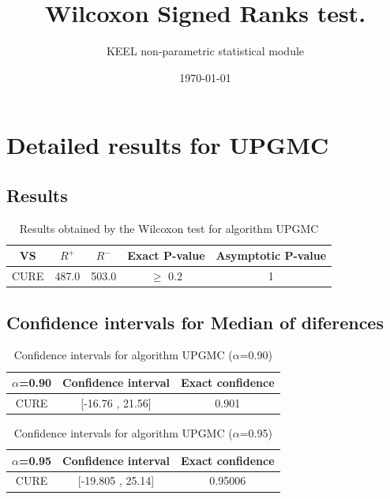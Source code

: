 \documentclass[a4paper,10pt]{article}
\title{Wilcoxon Signed Ranks test.}
\date{\today}
\author{KEEL non-parametric statistical module}
\begin{document}
\pagestyle{empty}
\maketitle
\thispagestyle{empty}



\section{Detailed results for UPGMC}


\subsection{Results}

\begin{table}[!htp]
\centering\small
\begin{tabular}{
|c|c|c|c|c|}
\hline
 VS & $R^{+}$ & $R^{-}$ & Exact P-value & Asymptotic P-value \\ \hline 
CURE & 487.0 & 503.0 & $\geq$ 0.2 & 1\\ \hline 

\end{tabular}
\caption{Results obtained by the Wilcoxon test for algorithm UPGMC}
\end{table}

\subsection{Confidence intervals for Median of diferences}

\begin{table}[!htp]
\centering\small
\begin{tabular}{
|c|c|c|}
\hline
 $\alpha$=0.90 & Confidence interval & Exact confidence \\ \hline 
CURE & [-16.76 , 21.56] & 0.901\\ \hline 

\end{tabular}
\caption{Confidence intervals for algorithm UPGMC ($\alpha$=0.90)}
\end{table}
\begin{table}[!htp]
\centering\small
\begin{tabular}{
|c|c|c|}
\hline
 $\alpha$=0.95 & Confidence interval & Exact confidence \\ \hline 
CURE & [-19.805 , 25.14] & 0.95006\\ \hline 

\end{tabular}
\caption{Confidence intervals for algorithm UPGMC ($\alpha$=0.95)}
\end{table}
\end{document}
